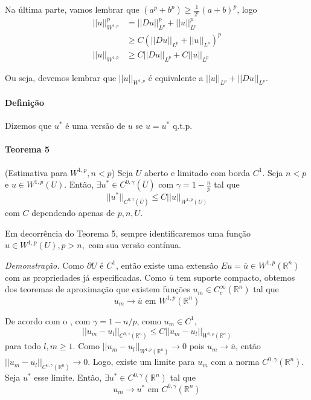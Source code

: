 \documentclass[a4paper, 11pt]{book}
\newcommand{\Rn}{{\mathbb{R}^n}}
\newcommand{\pu}{\partial U}
\begin{document}
Na última parte, vamos lembrar que $ (a^p + b^p) \geq \frac{1}{2^p}(a+b)^p$, logo \begin{align*}
	||u||_{W^{1,p}}^p &= ||Du||_{L^p}^p + ||u||_{L^p}^p \\ &\geq C(||Du||_{L^p} + ||u||_{L^p}) ^p \\
	||u||_{W^{1,p}} &\geq C ||Du||_{L^p} + C ||u||_{L^p}
\end{align*}

Ou seja, devemos lembrar que $||u||_{W^{1,p}}$ é equivalente a $||u||_{L^p} + ||Du||_{L^p}$.


\paragraph{Definição} Dizemos que $u^*$ é uma versão de $u$ se $u=u^*$ q.t.p.


\paragraph{Teorema 5}\label{t:sobolev-ineq-t5} (Estimativa para \( W^{1,p}, n<p \)) Seja \(U\) aberto e limitado com borda \( C^1\). Seja \(  n<p \) e \(  u \in W^{1,p}(U)  \). Então, \(\exists u^* \in C^{0,\gamma}(\overline{U})\) com \( \gamma = 1 - \frac{n}{p}\) tal que \[ || u^* ||_{C^{0,\gamma}(\overline{U})} \leq C ||u||_{W^{1,p}(U)} \] com \(C\) dependendo apenas de \(p, n, U\).

Em decorrência do Teorema 5, sempre identificaremos uma função $u \in W^{1,p}(U), p>n,$ com sua versão contínua.

\textit{Demonstração.} Como $\pu$ é $C^1$, então existe uma extensão $Eu = \overline{u} \in W^{1,p}(\Rn)$ com as propriedades já especificadas. Como $\overline{u}$ tem suporte compacto, obtemos dos teoremas de aproximação que existem funções $ u_m \in C^\infty_c(\Rn) $ tal que \[ u_m \rightarrow \overline{u} \text{ em } W^{1,p}(\Rn) \]

De acordo com o , com $\gamma = 1 - n/p$, como $u_m \in C^1$, \[ ||u_m - u_l||_{C^{0,\gamma}{(\mathbb{R}^n)}} \leq C ||u_m - u_l||_{W^{1,p}{(\mathbb{R}^n)}} \] para todo $l,m\geq1$.  Como $||u_m - u_l||_{W^{1,p}{(\mathbb{R}^n)}} \rightarrow 0$ pois $u_m \rightarrow \overline{u}$, então $||u_m - u_l||_{C^{0,\gamma}{(\mathbb{R}^n)}} \rightarrow 0$. Logo, existe um limite para $u_m$ com a norma $C^{0,\gamma}{(\mathbb{R}^n)}$. Seja $u^*$ esse limite. Então, $\exists u^* \in C^{0,\gamma}{(\mathbb{R}^n)}$ tal que \[ u_m \rightarrow u^* \text{ em }C^{0,\gamma}{(\mathbb{R}^n)}  \]
\end{document}
